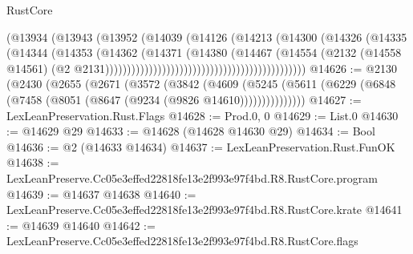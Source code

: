 \begin{lexlean}{RustCore}
\begin{coremodule}
                                                            (@13934
                                                              (@13943
                                                                (@13952
                                                                  (@14039
                                                                    (@14126
                                                                      (@14213
                                                                        (@14300
                                                                          (@14326
                                                                            (@14335
                                                                              (@14344
                                                                                (@14353
                                                                                  (@14362
                                                                                    (@14371
                                                                                      (@14380
                                                                                        (@14467
                                                                                          (@14554
                                                                                            (@2132
                                                                                              (@14558
                                                                                                @14561)
                                                                                              (@2
                                                                                                @2131))))))))))))))))))))))))))))))))))))))))))))))
@14626 := @2130
    (@2430
      (@2655
        (@2671
          (@3572
            (@3842
              (@4609
                (@5245 (@5611 (@6229 (@6848 (@7458 (@8051 (@8647 (@9234 (@9826 @14610)))))))))))))))
@14627 := LexLeanPreservation.Rust.Flags
@14628 := Prod.{0, 0}
@14629 := List.{0}
@14630 := @14629 @29
@14633 := @14628 (@14628 @14630 @29)
@14634 := Bool
@14636 := @2 (@14633 @14634)
@14637 := LexLeanPreservation.Rust.FunOK
@14638 := LexLeanPreserve.Cc05e3effed22818fe13e2f993e97f4bd.R8.RustCore.program
@14639 := @14637 @14638
@14640 := LexLeanPreserve.Cc05e3effed22818fe13e2f993e97f4bd.R8.RustCore.krate
@14641 := @14639 @14640
@14642 := LexLeanPreserve.Cc05e3effed22818fe13e2f993e97f4bd.R8.RustCore.flags

\end{coremodule}
\end{lexlean}
